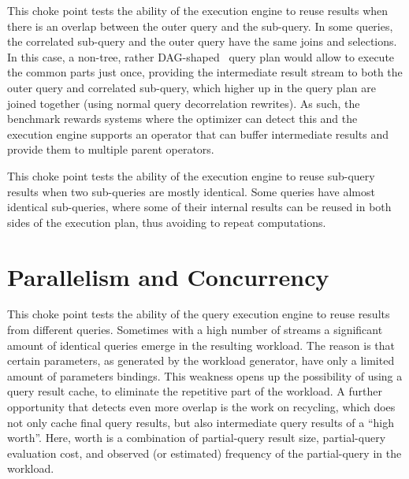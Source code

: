 



This choke point tests the ability of the execution engine to reuse results when there is an overlap between the outer query and the sub-query. In some queries, the correlated sub-query and the outer query have the same joins and selections.
In this case, a non-tree, rather DAG-shaped~\cite{DBLP:conf/btw/NeumannM09} query plan would allow to execute the common parts just once, providing the intermediate result stream to both the outer query and correlated sub-query,
which higher up in the query plan are joined together (using normal query decorrelation rewrites).
As such, the benchmark rewards systems where the optimizer can detect this and the execution engine supports an operator that can buffer intermediate results and provide them to multiple parent operators.





This choke point tests the ability of the execution engine to reuse sub-query results when two sub-queries are mostly identical.
Some queries have almost identical sub-queries, where some of their internal results can be reused in both sides of the execution plan, thus avoiding to repeat computations.




\section{Parallelism and Concurrency}



This choke point tests the ability of the query execution engine to reuse results from different queries. Sometimes with a high number of streams a significant amount of identical queries emerge in the resulting workload.
The reason is that certain parameters, as generated by the workload generator, have only a limited amount of parameters bindings.
This weakness opens up the possibility of using a query result cache, to eliminate the repetitive part of the workload.
A further opportunity that detects even more overlap is the work on recycling, which does not only cache final query results, but also intermediate query results of a ``high worth''.
Here, worth is a combination of partial-query result size, partial-query evaluation cost, and observed (or estimated) frequency of the partial-query in the workload.

